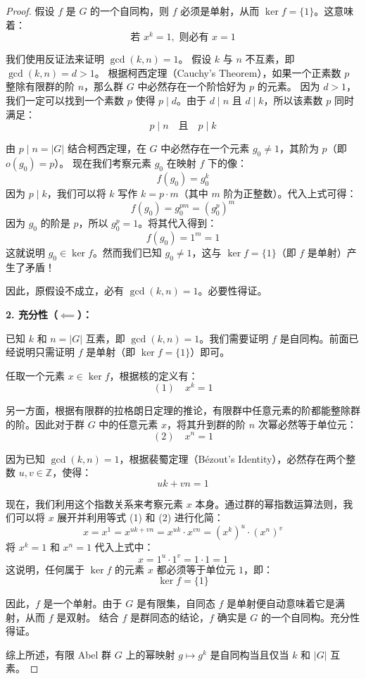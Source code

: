 \documentclass[]{article}
\begin{document}
\begin{proof}
假设 $f$ 是 $G$ 的一个自同构，则 $f$ 必须是单射，从而 $\ker f = \{1\}$。这意味着：
\[ \text{若 } x^k = 1, \text{ 则必有 } x = 1 \]

我们使用反证法来证明 $\gcd(k, n) = 1$。
假设 $k$ 与 $n$ 不互素，即 $\gcd(k, n) = d > 1$。
根据柯西定理（Cauchy's Theorem），如果一个正素数 $p$ 整除有限群的阶 $n$，那么群 $G$ 中必然存在一个阶恰好为 $p$ 的元素。
因为 $d > 1$，我们一定可以找到一个素数 $p$ 使得 $p \mid d$。由于 $d \mid n$ 且 $d \mid k$，所以该素数 $p$ 同时满足：
\[ p \mid n \quad \text{且} \quad p \mid k \]

由 $p \mid n = |G|$ 结合柯西定理，在 $G$ 中必然存在一个元素 $g_0 \neq 1$，其阶为 $p$（即 $o(g_0) = p$）。
现在我们考察元素 $g_0$ 在映射 $f$ 下的像：
\[ f(g_0) = g_0^k \]
因为 $p \mid k$，我们可以将 $k$ 写作 $k = p \cdot m$（其中 $m$ 阶为正整数）。代入上式可得：
\[ f(g_0) = g_0^{pm} = (g_0^p)^m \]
因为 $g_0$ 的阶是 $p$，所以 $g_0^p = 1$。将其代入得到：
\[ f(g_0) = 1^m = 1 \]
这就说明 $g_0 \in \ker f$。然而我们已知 $g_0 \neq 1$，这与 $\ker f = \{1\}$（即 $f$ 是单射）产生了矛盾！

因此，原假设不成立，必有 $\gcd(k, n) = 1$。必要性得证。

\bigskip
\noindent \textbf{2. 充分性（$\impliedby$）：}

已知 $k$ 和 $n = |G|$ 互素，即 $\gcd(k, n) = 1$。我们需要证明 $f$ 是自同构。前面已经说明只需证明 $f$ 是单射（即 $\ker f = \{1\}$）即可。

任取一个元素 $x \in \ker f$，根据核的定义有：
\[ (1) \quad x^k = 1 \]

另一方面，根据有限群的拉格朗日定理的推论，有限群中任意元素的阶都能整除群的阶。因此对于群 $G$ 中的任意元素 $x$，将其升到群的阶 $n$ 次幂必然等于单位元：
\[ (2) \quad x^n = 1 \]

因为已知 $\gcd(k, n) = 1$，根据裴蜀定理（Bézout's Identity），必然存在两个整数 $u, v \in \mathbb{Z}$，使得：
\[ uk + vn = 1 \]

现在，我们利用这个指数关系来考察元素 $x$ 本身。通过群的幂指数运算法则，我们可以将 $x$ 展开并利用等式 (1) 和 (2) 进行化简：
\[ x = x^1 = x^{uk + vn} = x^{uk} \cdot x^{vn} = (x^k)^u \cdot (x^n)^v \]
将 $x^k = 1$ 和 $x^n = 1$ 代入上式中：
\[ x = 1^u \cdot 1^v = 1 \cdot 1 = 1 \]
这说明，任何属于 $\ker f$ 的元素 $x$ 都必须等于单位元 $1$，即：
\[ \ker f = \{1\} \]

因此，$f$ 是一个单射。由于 $G$ 是有限集，自同态 $f$ 是单射便自动意味着它是满射，从而 $f$ 是双射。
结合 $f$ 是群同态的结论，$f$ 确实是 $G$ 的一个自同构。充分性得证。

\bigskip
综上所述，有限 Abel 群 $G$ 上的幂映射 $g \mapsto g^k$ 是自同构当且仅当 $k$ 和 $|G|$ 互素。


\end{proof}
\end{document}

